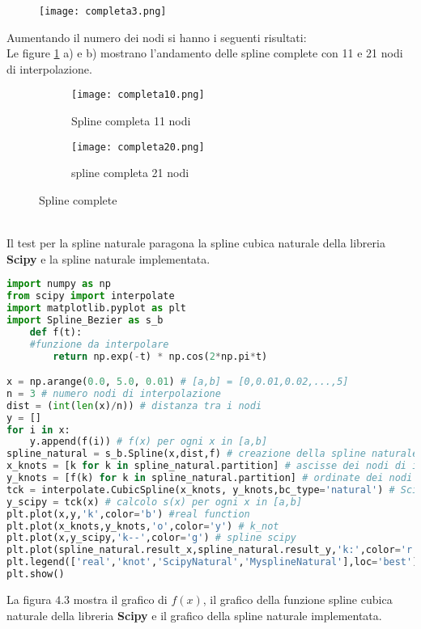 \documentclass[a4paper,12pt]{report}
\theoremstyle{definition}
\begin{document}
\begin{figure}[hb]
	\centering
	\texttt{[image: completa3.png]}
	\caption{}
\end{figure}
Aumentando il numero dei nodi si hanno i seguenti risultati:\\
Le figure \ref{fig:3pts} a) e b) mostrano l'andamento delle spline complete con 11 e 21 nodi di interpolazione.
\begin{figure}[h!]
	\centering
	\begin{subfigure}{0.6\linewidth}
		\texttt{[image: completa10.png]} 
		\caption{Spline completa 11 nodi}
	\end{subfigure}
	\begin{subfigure}{0.6\linewidth}
		\texttt{[image: completa20.png]}
		\caption{spline completa 21 nodi}
	\end{subfigure}
	\caption{Spline complete}
	\label{fig:3pts}
\end{figure}\\
Il test per la spline naturale paragona la spline cubica naturale della libreria \textbf{Scipy} e la spline naturale implementata.
\begin{lstlisting}[language=Python]
import numpy as np
from scipy import interpolate
import matplotlib.pyplot as plt
import Spline_Bezier as s_b
	def f(t):
	#funzione da interpolare
		return np.exp(-t) * np.cos(2*np.pi*t)

x = np.arange(0.0, 5.0, 0.01) # [a,b] = [0,0.01,0.02,...,5]
n = 3 # numero nodi di interpolazione
dist = (int(len(x)/n)) # distanza tra i nodi
y = []
for i in x:
	y.append(f(i)) # f(x) per ogni x in [a,b]
spline_natural = s_b.Spline(x,dist,f) # creazione della spline naturale
x_knots = [k for k in spline_natural.partition] # ascisse dei nodi di interpolazione
y_knots = [f(k) for k in spline_natural.partition] # ordinate dei nodi di interpolazione
tck = interpolate.CubicSpline(x_knots, y_knots,bc_type='natural') # Scipyspline naturale s(x)
y_scipy = tck(x) # calcolo s(x) per ogni x in [a,b]
plt.plot(x,y,'k',color='b') #real function
plt.plot(x_knots,y_knots,'o',color='y') # k_not
plt.plot(x,y_scipy,'k--',color='g') # spline scipy
plt.plot(spline_natural.result_x,spline_natural.result_y,'k:',color='r') #Myspline
plt.legend(['real','knot','ScipyNatural','MysplineNatural'],loc='best')
plt.show()
\end{lstlisting}
La figura $4.3$ mostra il grafico di $f(x)$, il grafico della funzione spline cubica naturale della libreria \textbf{Scipy} e il grafico della spline naturale implementata.
\end{document}
